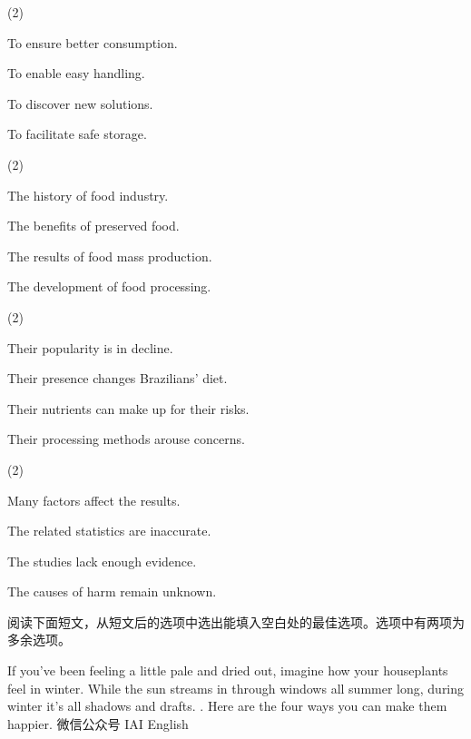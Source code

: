 \documentclass{英语试卷}
\begin{document}
\begin{choices}(2)
  \item To ensure better consumption.
  \item To enable easy handling.
  \item To discover new solutions.
  \item To facilitate safe storage.
\end{choices}
\begin{choices}(2)
  \item The history of food industry.
  \item The benefits of preserved food.
  \item The results of food mass production.
  \item The development of food processing.
\end{choices}
\begin{choices}(2)
  \item Their popularity is in decline.
  \item Their presence changes Brazilians' diet.
  \item Their nutrients can make up for their risks.
  \item Their processing methods arouse concerns.
\end{choices}
\begin{choices}(2)
  \item Many factors affect the results.
  \item The related statistics are inaccurate.
  \item The studies lack enough evidence.
  \item The causes of harm remain unknown.
\end{choices}
\par 阅读下面短文，从短文后的选项中选出能填入空白处的最佳选项。选项中有两项为多余选项。\par
\par If you've been feeling a little pale and dried out, imagine how your houseplants feel in winter. While the sun streams in through windows all summer long, during winter it's all shadows and drafts. . Here are the four ways you can make them happier. 微信公众号 IAI English\par
\end{document}

